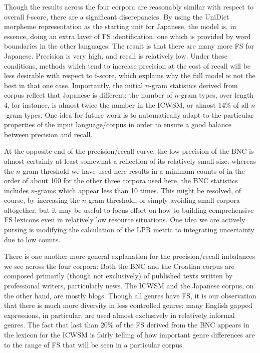 \documentclass[11pt,letterpaper]{article}
\begin{document}
Though the results across the four corpora are reasonably similar with respect to overall f-score, there are a significant discrepancies. By using the UniDict morpheme representation as the starting unit for Japanese, the model is, in essence, doing an extra layer of FS identification, one which is provided by word boundaries in the other languages. The result is that there are many more FS for Japanese. Precision is very high, and recall is relatively low. Under these conditions, methods which tend to increase precision at the cost of recall will be less desirable with respect to f-score, which explains why the full model is not the best in that one case.  Importantly, the initial $n$-gram statistics derived from corpus reflect that Japanese is different: the number of $n$-gram types, over length 4, for instance, is almost twice the number in the ICWSM, or almost 14\% of all $n$-gram types. One idea for future work is to automatically adapt to the particular properties of the input language/corpus in order to ensure a good balance between precision and recall.

At the opposite end of the precision/recall curve, the low precision of the BNC is almost certainly at least somewhat a reflection of its relatively small size: whereas the $n$-gram threshold we have used here results in a minimum counts of in the order of about 100 for the other three corpora used here, the BNC statistics includes $n$-grams which appear less than 10 times. This might be resolved, of course, by increasing the $n$-gram threshold, or simply avoiding small corpora altogether, but it may be useful to focus effort on how to building comprehensive FS lexicons even in relatively low resource situations. One idea we are actively pursing is modifying the calculation of the LPR metric to integrating uncertainty due to low counts.

There is one another more general explanation for the precision/recall imbalances we see across the four corpora: Both the BNC and the Croatian corpus are composed primarily (though not exclusively) of published texts written by professional writers, particularly news. The ICWSM and the Japanese corpus, on the other hand, are mostly blogs. Though all genres have FS, it is our observation that there is much more diversity in less controlled genres: many English gapped expressions, in particular, are used almost exclusively in relatively informal genres. The fact that last than 20\% of the FS derived from the BNC appears in the lexicon for the ICWSM is fairly telling of how important genre differences are to the range of FS that will be seen in a particular corpus.
\end{document}
